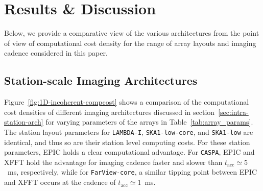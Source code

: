 \documentclass[
  journal=pasa,
  manuscript=article-type,
  year=2020,
  volume=37,
]{cup-journal}
\begin{document}




\section{Results \& Discussion} \label{sec:results}

Below, we provide a comparative view of the various architectures from the point of view of computational cost density for the range of array layouts and imaging cadence considered in this paper. 

\subsection{Station-scale Imaging Architectures}\label{sec:station-scale-imaging}

Figure~\ref{fig:1D-incoherent-compcost} shows a comparison of the computational cost densities of different imaging architectures discussed in section~\ref{sec:intra-station-arch} for varying parameters of the arrays in Table~\ref{tab:array_params}. The station layout parameters for \texttt{LAMBDA-I}, \texttt{SKA1-low-core}, and \texttt{SKA1-low} are identical, and thus so are their station level computing costs. For these station parameters, EPIC holds a clear computational advantage. For \texttt{CASPA}, EPIC and XFFT hold the advantage for imaging cadence faster and slower than $t_\textrm{acc}\simeq 5$~ms, respectively, while for \texttt{FarView-core}, a similar tipping point between EPIC and XFFT occurs at the cadence of $t_\textrm{acc}\simeq 1$~ms.
\end{document}
